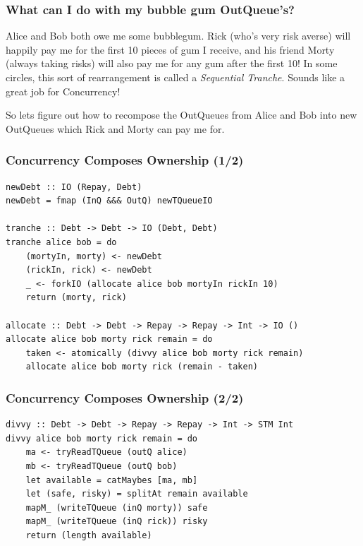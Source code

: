 \documentclass[11pt,reqno]{beamer}
\begin{document}
\begin{frame}
  \frametitle{What can I do with my bubble gum OutQueue's?}
Alice and Bob both owe me some bubblegum. Rick (who's very risk averse) will happily pay me
for the first 10 pieces of gum I receive, and his friend Morty (always taking risks) will
also pay me for any gum after the first 10! In some circles, this sort of rearrangement
is called a \emph{Sequential Tranche}. Sounds like a great job for Concurrency!


So lets figure out how to recompose the OutQueues from Alice and Bob into new
OutQueues which Rick and Morty can pay me for.

\end{frame}

\begin{frame}[fragile]
\frametitle{Concurrency Composes Ownership (1/2)}

\begin{verbatim}
newDebt :: IO (Repay, Debt)
newDebt = fmap (InQ &&& OutQ) newTQueueIO

tranche :: Debt -> Debt -> IO (Debt, Debt)
tranche alice bob = do
    (mortyIn, morty) <- newDebt
    (rickIn, rick) <- newDebt
    _ <- forkIO (allocate alice bob mortyIn rickIn 10)
    return (morty, rick)

allocate :: Debt -> Debt -> Repay -> Repay -> Int -> IO ()
allocate alice bob morty rick remain = do
    taken <- atomically (divvy alice bob morty rick remain)
    allocate alice bob morty rick (remain - taken)
\end{verbatim}
\end{frame}

\begin{frame}[fragile]
\frametitle{Concurrency Composes Ownership (2/2)}

\begin{verbatim}
divvy :: Debt -> Debt -> Repay -> Repay -> Int -> STM Int
divvy alice bob morty rick remain = do
    ma <- tryReadTQueue (outQ alice)
    mb <- tryReadTQueue (outQ bob)
    let available = catMaybes [ma, mb]
    let (safe, risky) = splitAt remain available
    mapM_ (writeTQueue (inQ morty)) safe
    mapM_ (writeTQueue (inQ rick)) risky
    return (length available)
\end{verbatim}
\end{frame}

\end{document}
